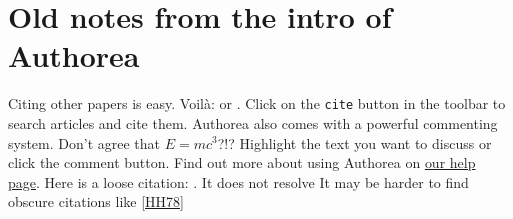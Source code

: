 \section{Old notes from the intro of Authorea}

Citing other papers is easy. Voilà: \cite{2012} or \cite{Holstein_2009}. Click on the \verb|cite| button in the toolbar to search articles and cite them. Authorea also comes with a powerful commenting system. Don't agree that $E  =  mc^{3}$?!? Highlight the text you want to discuss or click the comment button. Find out more about using Authorea on \href{https://www.authorea.com/help}{our help page}. Here is a loose citation: \cite{Hogeweg_2011}. It does not resolve\ldot
It may be harder to find obscure citations like \ref{HH78}
  
  
  
  
  